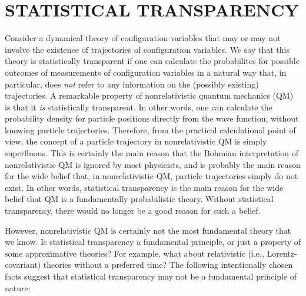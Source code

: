 \documentclass[11pt]{article}
\begin{document}
\section{STATISTICAL TRANSPARENCY}
\label{secST}

Consider a dynamical theory of configuration variables 
that may or may not involve the existence 
of trajectories of configuration
variables. We say that this theory 
is statistically transparent 
if one can calculate the probabilites for possible outcomes 
of measurements of configuration variables in a natural 
way that, in particular, does {\em not} 
refer to any information on the
(possibly existing) trajectories. 
A remarkable property of nonrelativistic 
quantum mechanics (QM) 
is that it {\em is} statistically transparent. 
In other words, one can calculate 
the probability density for particle positions directly from the 
wave function, without knowing particle trajectories. 
Therefore, from the practical calculational point of view, 
the concept of a particle trajectory in nonrelativistic QM 
is simply superfluous. 
This is certainly the main reason 
that the Bohmian interpretation of 
nonrelativistic QM is ignored by most physicists,
and is probably the main reason for
the wide belief that, in nonrelativistic QM, 
particle trajectories simply do not exist.
In other words, statistical transparency is the main reason 
for the wide belief that QM is a fundamentally probabilistic 
theory. Without statistical transparency, there would 
no longer be a good reason for such a belief. 

However, nonrelativistic QM is certainly not the most fundamental 
theory that we know. Is statistical transparency a fundamental 
principle, or just a property of some approximative 
theories? For example, what about relativistic (i.e., Lorentz-covariant)
theories without a preferred time? The following intentionally 
chosen facts suggest that statistical transparency may not be 
a fundamental principle of nature:
\end{document}
